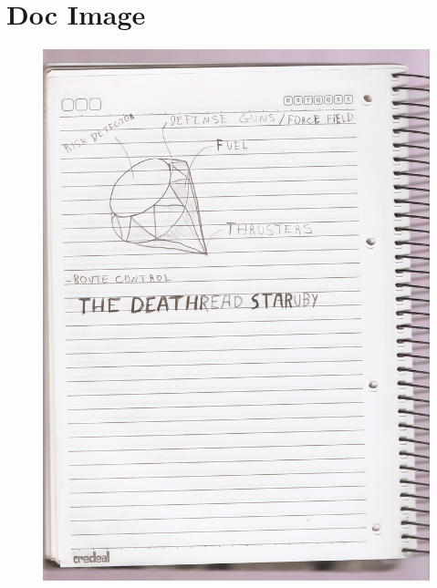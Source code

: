 \section{Doc Image}



\begin{frame}
	\begin{figure}[!htb]
     \centering
     \includegraphics[scale=0.1]{slides/DEATHread-STARuby.jpg}
	\end{figure}
\end{frame}


